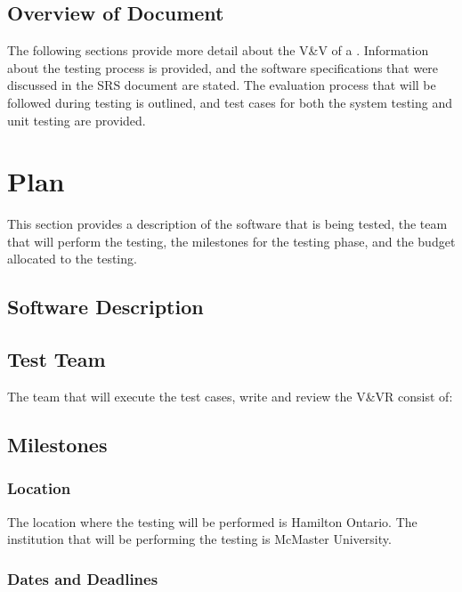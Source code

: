 \documentclass[12pt]{article}
\begin{document}
\subsection{Overview of Document }
The following sections provide more detail about the V\&V of a . Information about the testing process is provided, and the software specifications
that were discussed in the SRS document are stated.  The evaluation process that will be followed during 
testing is outlined, and test cases for both the system testing and unit testing are provided. 

%
%

\section{Plan}
This section provides a description of the software that is being tested, the team that will
perform the testing, the milestones for the testing phase, and the budget allocated to the testing. 

\subsection{Software Description}


\subsection{Test Team} 
The team that will execute the test cases, write and review the V\&VR consist of:


\subsection{Milestones}

\subsubsection{Location}
The location where the testing will be performed is Hamilton Ontario. The institution that
will be performing the testing is McMaster University. 


\subsubsection{Dates and Deadlines}
\end{document}
